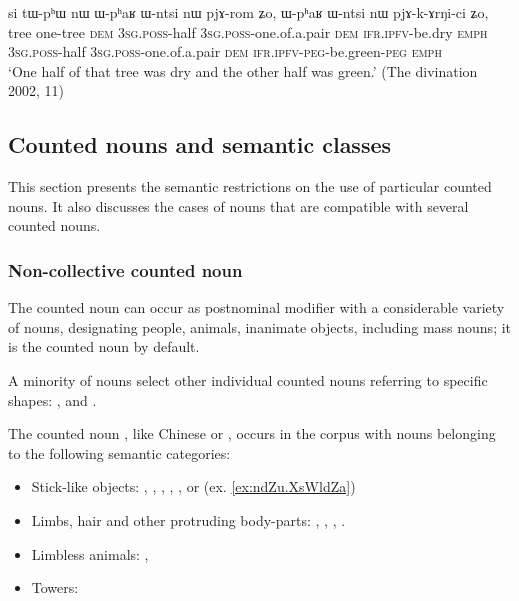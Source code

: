 \begin{exe}
	\ex \label{ex:tWphW.nW}
	\gll si tɯ-pʰɯ nɯ ɯ-pʰaʁ ɯ-ntsi nɯ pjɤ-rom ʑo, ɯ-pʰaʁ ɯ-ntsi nɯ pjɤ-k-ɤrŋi-ci ʑo, \\
	tree one-tree \textsc{dem} \textsc{3sg}.\textsc{poss}-half \textsc{3sg}.\textsc{poss}-one.of.a.pair \textsc{dem} \textsc{ifr}.\textsc{ipfv}-be.dry \textsc{emph} \textsc{3sg}.\textsc{poss}-half \textsc{3sg}.\textsc{poss}-one.of.a.pair \textsc{dem} \textsc{ifr}.\textsc{ipfv}-\textsc{peg}-be.green-\textsc{peg} \textsc{emph} \\
	\glt `One half of that tree was dry and the other half was green.' (The divination 2002, 11)
\end{exe}


\subsection{Counted nouns and semantic classes} \label{sec:CN.classification}

This section presents the semantic restrictions on the use of particular counted nouns. It also discusses the cases of nouns that are compatible with several counted nouns.

\subsubsection{Non-collective counted noun}
The counted noun  can occur as postnominal modifier with a considerable variety of nouns, designating people, animals, inanimate objects, including mass nouns; it is the counted noun by default.

A minority of nouns select other individual counted nouns referring to specific shapes: ,  and .

 
The counted noun , like Chinese  or , occurs in the corpus with nouns belonging to the following semantic categories:

\begin{itemize}
\item Stick-like objects:  , , , ,  ,     or  (ex. \ref{ex:ndZu.XsWldZa})
\item Limbs, hair and other protruding body-parts: , ,  , .
\item Limbless animals:  ,  
\item Towers: 
\end{itemize} 

